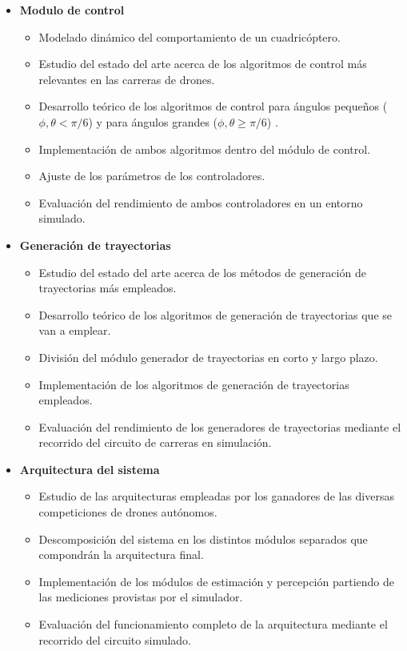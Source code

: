 \begin{itemize}
	\item \textbf{Modulo de control}	
	\begin{itemize}
		\item Modelado dinámico del comportamiento de un cuadricóptero.
		\item Estudio del estado del arte acerca de los algoritmos de control más relevantes en las carreras de drones.
		\item Desarrollo teórico de los algoritmos de control para ángulos pequeños ($\phi,\theta  < \pi/6$) y para ángulos grandes ($\phi,\theta  \ge \pi/6 $) .
		\item Implementación de ambos algoritmos dentro del módulo de control.
		\item Ajuste de los parámetros de los controladores.
		\item Evaluación del rendimiento de ambos controladores en un entorno simulado.
				
	\end{itemize}

	\item \textbf{Generación de trayectorias}	
	\begin{itemize}
		\item Estudio del estado del arte acerca de los métodos de generación de trayectorias más empleados.
		\item Desarrollo teórico de los algoritmos de generación de trayectorias que se van a emplear.
		\item División del módulo generador de trayectorias en corto y largo plazo.
		\item Implementación de los algoritmos de generación de trayectorias empleados.
		\item Evaluación del rendimiento de los generadores de trayectorias mediante el recorrido del circuito de carreras en simulación.
	\end{itemize}

	\item \textbf{Arquitectura del sistema}	
	\begin{itemize}
		\item Estudio de las arquitecturas empleadas por los ganadores de las diversas competiciones de drones autónomos.
		\item Descomposición del sistema en los distintos módulos separados que compondrán la arquitectura final.
		\item Implementación de los módulos de estimación y percepción partiendo de las mediciones provistas por el simulador.
		\item Evaluación del funcionamiento completo de la arquitectura mediante el recorrido del circuito simulado. 
		
	\end{itemize}
	
	
\end{itemize}